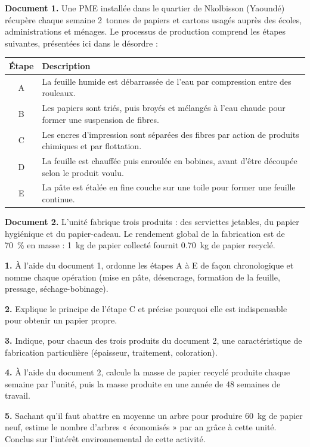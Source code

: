 \documentclass[11pt]{article}
\newcounter{popsec}
\newcounter{popsub}
\newcommand{\courssub}[1]{%
  \stepcounter{popsub}%
  \par\vspace{9pt}\noindent{\popxbold\fontsize{11.5}{13}\selectfont\color{popink}{\color{poporange}\thepopsec.\thepopsub}\hspace{6pt}#1}\par\nopagebreak\vspace{4pt}
}
\begin{document}
\courssub{Je me prépare au Bac}

\begin{exercice}
\textbf{Document 1.} Une PME installée dans le quartier de Nkolbisson (Yaoundé) récupère chaque semaine \SI{2}{tonnes} de papiers et cartons usagés auprès des écoles, administrations et ménages. Le processus de production comprend les étapes suivantes, présentées ici dans le désordre :

\begin{center}
\begin{tabularx}{\linewidth}{|c|X|}
\hline
\rowcolor{popblueL} \textbf{Étape} & \textbf{Description} \\
\hline
A & La feuille humide est débarrassée de l'eau par compression entre des rouleaux. \\
\hline
B & Les papiers sont triés, puis broyés et mélangés à l'eau chaude pour former une suspension de fibres. \\
\hline
C & Les encres d'impression sont séparées des fibres par action de produits chimiques et par flottation. \\
\hline
D & La feuille est chauffée puis enroulée en bobines, avant d'être découpée selon le produit voulu. \\
\hline
E & La pâte est étalée en fine couche sur une toile pour former une feuille continue. \\
\hline
\end{tabularx}
\end{center}

\textbf{Document 2.} L'unité fabrique trois produits : des serviettes jetables, du papier hygiénique et du papier-cadeau. Le rendement global de la fabrication est de \SI{70}{\%} en masse : \SI{1}{kg} de papier collecté fournit \SI{0,70}{kg} de papier recyclé.

\textbf{1.} À l'aide du document 1, ordonne les étapes A à E de façon chronologique et nomme chaque opération (mise en pâte, désencrage, formation de la feuille, pressage, séchage-bobinage).

\textbf{2.} Explique le principe de l'étape C et précise pourquoi elle est indispensable pour obtenir un papier propre.

\textbf{3.} Indique, pour chacun des trois produits du document 2, une caractéristique de fabrication particulière (épaisseur, traitement, coloration).

\textbf{4.} À l'aide du document 2, calcule la masse de papier recyclé produite chaque semaine par l'unité, puis la masse produite en une année de 48 semaines de travail.

\textbf{5.} Sachant qu'il faut abattre en moyenne un arbre pour produire \SI{60}{kg} de papier neuf, estime le nombre d'arbres « économisés » par an grâce à cette unité. Conclus sur l'intérêt environnemental de cette activité.
\end{exercice}
\end{document}
